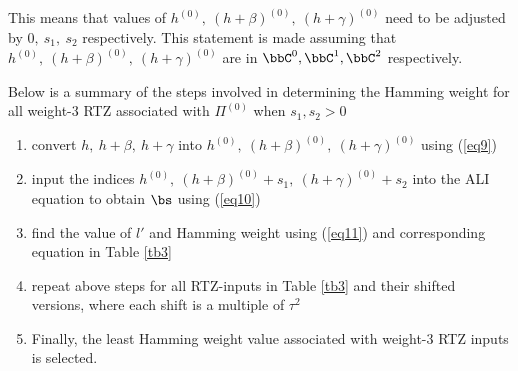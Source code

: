  This means that values of $h^{(0)},~(h+\beta)^{(0)},~(h+\gamma)^{(0)}$ need to be adjusted by $0,~s_1,~s_2$ respectively. This statement is made assuming that $h^{(0)},~(h+\beta)^{(0)},~(h+\gamma)^{(0)}$ are in $\bbC^0,\bbC^1,\bbC^2$ respectively.
 
  Below is a summary of the steps involved in determining the Hamming weight for all weight-$3$ RTZ associated with $\Pi^{(0)}$ when $s_1,s_2>0$
 \begin{enumerate}
 \item convert  $h,~h+\beta,~h+\gamma$ into $h^{(0)},~(h+\beta)^{(0)},~(h+\gamma)^{(0)}$ using (\ref{eq9})
 
 \item input the indices $h^{(0)},~(h+\beta)^{(0)}+s_1,~(h+\gamma)^{(0)}+s_2$
 into the ALI equation to obtain $\bs$ using (\ref{eq10})
 
 \item find the value of $l'$ and  Hamming weight using (\ref{eq11}) and corresponding equation in Table \ref{tb3}
 
 \item repeat above steps for all RTZ-inputs in Table \ref{tb3} and their shifted versions, where each shift is a multiple of $\tau^2$
 
\item Finally, the least Hamming weight value associated with weight-$3$ RTZ inputs is selected.
 \end{enumerate}
 
